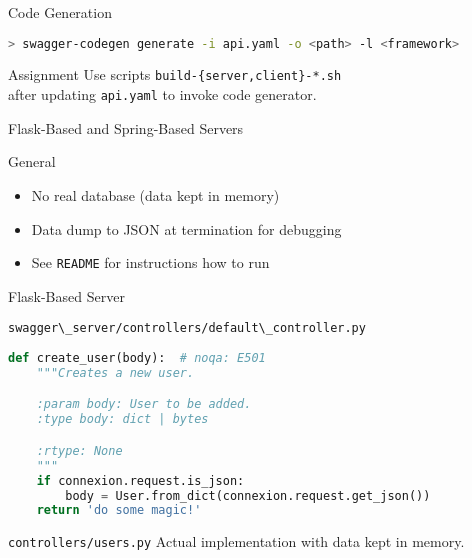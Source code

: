 \begin{frame}[fragile]{Code Generation}
\begin{lstlisting}[language=bash,style=mini]
> swagger-codegen generate -i api.yaml -o <path> -l <framework>
\end{lstlisting}

    \begin{block}{Assignment}
        Use scripts \lstinline|build-{server,client}-*.sh| \\
        after updating \lstinline{api.yaml} to invoke code generator.
    \end{block}
\end{frame}


\begin{frame}{Flask-Based and Spring-Based Servers}
    \begin{block}{General}
        \begin{itemize}
            \item No real database (data kept in memory)
            \item Data dump to JSON at termination for debugging
            \item See \lstinline{README} for instructions how to run
        \end{itemize}
    \end{block}
\end{frame}


\begin{frame}[fragile]{Flask-Based Server}
\begin{block}{\lstinline{swagger\_server/controllers/default\_controller.py}}
\begin{lstlisting}[language=python,style=mini]
def create_user(body):  # noqa: E501
    """Creates a new user.

    :param body: User to be added.
    :type body: dict | bytes

    :rtype: None
    """
    if connexion.request.is_json:
        body = User.from_dict(connexion.request.get_json())
    return 'do some magic!'
\end{lstlisting}
\end{block}

    \begin{block}{\lstinline{controllers/users.py}}
        Actual implementation with data kept in memory.
    \end{block}
\end{frame}


